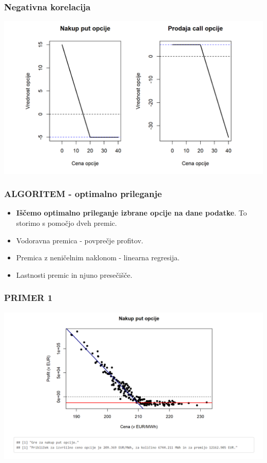 \documentclass[10pt]{beamer}
\begin{document}
\begin{frame}
\frametitle{Negativna korelacija}
\includegraphics[width=1\textwidth]{poz_kor.png}
\end{frame}

\begin{frame}
\frametitle{ALGORITEM - optimalno prileganje}
\begin{itemize}
\item{\textbf{Iščemo optimalno prileganje izbrane opcije na dane podatke}. To storimo s pomočjo dveh premic.}
\item{Vodoravna premica - povprečje profitov.}
\item{Premica z neničelnim naklonom - linearna regresija.}
\item{Lastnosti premic in njuno presečišče.}
\end{itemize}
\end{frame}

\begin{frame}
\frametitle{PRIMER 1}
\includegraphics[width=1\textwidth]{primer1.png}
\end{frame}
\end{document}
